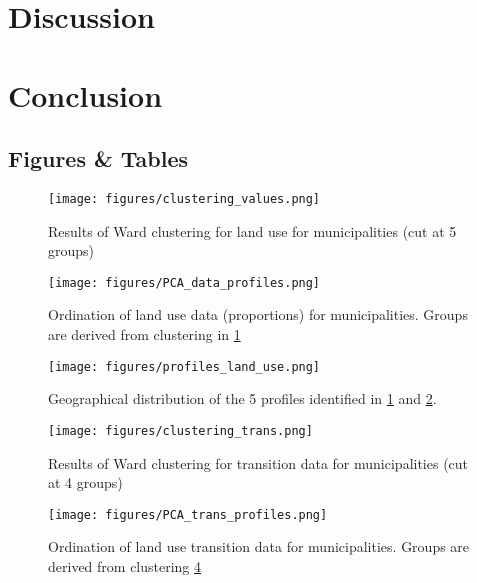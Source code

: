 \section{Discussion}

\section{Conclusion}

\newpage
\begin{center}
\section*{Figures \& Tables}
\end{center}

\begin{figure}[h!]
  \centering
    \texttt{[image: figures/clustering\_values.png]}
  \caption{Results of Ward clustering for land use for municipalities (cut at 5 groups)}
  \label{fig:clustervals}
\end{figure}

\begin{figure}[h!]
  \centering
    \texttt{[image: figures/PCA\_data\_profiles.png]}
  \caption{Ordination of land use data (proportions) for municipalities. Groups are derived from clustering in \ref{fig:clustervals}}
  \label{fig:PCAvals}
\end{figure}

\begin{figure}[h!]
  \centering
    \texttt{[image: figures/profiles\_land\_use.png]}
  \caption{Geographical distribution of the 5 profiles identified in \ref{fig:clustervals} and \ref{fig:PCAvals}.}
  \label{fig:mapvals}
\end{figure}

\begin{figure}[h!]
  \centering
    \texttt{[image: figures/clustering\_trans.png]}
  \caption{Results of Ward clustering for transition data for municipalities (cut at 4 groups)}
  \label{fig:clustertrans}
\end{figure}

\begin{figure}[h!]
  \centering
    \texttt{[image: figures/PCA\_trans\_profiles.png]}
  \caption{Ordination of land use transition data for municipalities. Groups are derived from clustering \ref{fig:clustertrans}}
  \label{fig:PCAtrans}
\end{figure}


